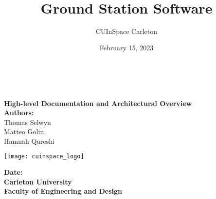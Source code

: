 \title{Ground Station Software}
\author{CUInSpace Carleton}
\date{February 15, 2023}

\makeatletter
    \begin{titlepage}
        \begin{center}
        {}
        {\fontsize{34}{50}\selectfont \bf \@title}\\ 
	    {\ \\}
        \vbox{}\vspace{5cm}
            \centering
            {\bf\Large High-level Documentation and Architectural Overview}\\[3cm] 
            {\large \textbf{Authors:}\\}
            {\large Thomas Selwyn\\}
            {\large Matteo Golin\\}
            {\large Hamnah Qureshi\\}
            \begin{center}
                \texttt{[image: cuinspace\_logo]}
            \end{center}
            {\large \textbf{Date:} \@date\\}
            {\large \textbf{Carleton University}\\}
            {\large \textbf{Faculty of Engineering and Design}\\}
        \end{center}
    \end{titlepage}
\makeatother